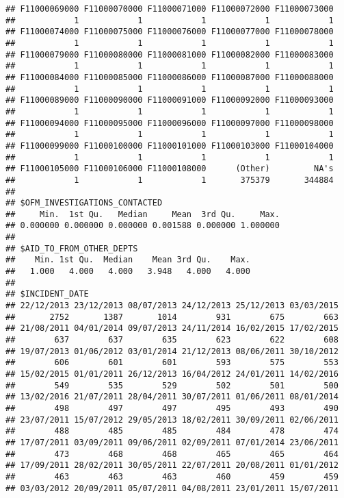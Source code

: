 \documentclass[]{article}
\begin{document}
\begin{verbatim}
## F11000069000 F11000070000 F11000071000 F11000072000 F11000073000 
##            1            1            1            1            1 
## F11000074000 F11000075000 F11000076000 F11000077000 F11000078000 
##            1            1            1            1            1 
## F11000079000 F11000080000 F11000081000 F11000082000 F11000083000 
##            1            1            1            1            1 
## F11000084000 F11000085000 F11000086000 F11000087000 F11000088000 
##            1            1            1            1            1 
## F11000089000 F11000090000 F11000091000 F11000092000 F11000093000 
##            1            1            1            1            1 
## F11000094000 F11000095000 F11000096000 F11000097000 F11000098000 
##            1            1            1            1            1 
## F11000099000 F11000100000 F11000101000 F11000103000 F11000104000 
##            1            1            1            1            1 
## F11000105000 F11000106000 F11000108000      (Other)         NA's 
##            1            1            1       375379       344884 
## 
## $OFM_INVESTIGATIONS_CONTACTED
##     Min.  1st Qu.   Median     Mean  3rd Qu.     Max. 
## 0.000000 0.000000 0.000000 0.001588 0.000000 1.000000 
## 
## $AID_TO_FROM_OTHER_DEPTS
##    Min. 1st Qu.  Median    Mean 3rd Qu.    Max. 
##   1.000   4.000   4.000   3.948   4.000   4.000 
## 
## $INCIDENT_DATE
## 22/12/2013 23/12/2013 08/07/2013 24/12/2013 25/12/2013 03/03/2015 
##       2752       1387       1014        931        675        663 
## 21/08/2011 04/01/2014 09/07/2013 24/11/2014 16/02/2015 17/02/2015 
##        637        637        635        623        622        608 
## 19/07/2013 01/06/2012 03/01/2014 21/12/2013 08/06/2011 30/10/2012 
##        606        601        601        593        575        553 
## 15/02/2015 01/01/2011 26/12/2013 16/04/2012 24/01/2011 14/02/2016 
##        549        535        529        502        501        500 
## 13/02/2016 21/07/2011 28/04/2011 30/07/2011 01/06/2011 08/01/2014 
##        498        497        497        495        493        490 
## 23/07/2011 15/07/2012 29/05/2013 18/02/2011 30/09/2011 02/06/2011 
##        488        485        485        484        478        474 
## 17/07/2011 03/09/2011 09/06/2011 02/09/2011 07/01/2014 23/06/2011 
##        473        468        468        465        465        464 
## 17/09/2011 28/02/2011 30/05/2011 22/07/2011 20/08/2011 01/01/2012 
##        463        463        463        460        459        459 
## 03/03/2012 20/09/2011 05/07/2011 04/08/2011 23/01/2011 15/07/2011 

\end{verbatim}
\end{document}
